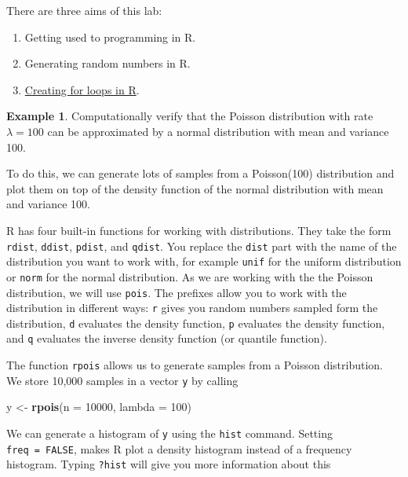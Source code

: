 \documentclass[
]{book}
\newenvironment{Shaded}{\begin{snugshade}}{\end{snugshade}}
\newcommand{\AttributeTok}[1]{\textcolor[rgb]{0.13,0.29,0.53}{#1}}
\newcommand{\DecValTok}[1]{\textcolor[rgb]{0.00,0.00,0.81}{#1}}
\newcommand{\FunctionTok}[1]{\textcolor[rgb]{0.13,0.29,0.53}{\textbf{#1}}}
\newcommand{\NormalTok}[1]{#1}
\newcommand{\OtherTok}[1]{\textcolor[rgb]{0.56,0.35,0.01}{#1}}
\providecommand{\tightlist}{%
  \setlength{\itemsep}{0pt}\setlength{\parskip}{0pt}}
\theoremstyle{definition}
\theoremstyle{definition}
\newtheorem{example}{Example}[chapter]
\theoremstyle{definition}
\theoremstyle{definition}
\theoremstyle{remark}
\begin{document}
There are three aims of this lab:

\begin{enumerate}
\def\labelenumi{\arabic{enumi}.}
\tightlist
\item
  Getting used to programming in R.
\item
  Generating random numbers in R.
\item
  \href{https://www.w3schools.com/r/r_for_loop.asp}{Creating for loops in R}.
\end{enumerate}

\begin{example}
Computationally verify that the Poisson distribution with rate \(\lambda = 100\) can be approximated by a normal distribution with mean and variance 100.

To do this, we can generate lots of samples from a Poisson(100) distribution and plot them on top of the density function of the normal distribution with mean and variance 100.

R has four built-in functions for working with distributions. They take the form \texttt{rdist}, \texttt{ddist}, \texttt{pdist}, and \texttt{qdist}. You replace the \texttt{dist} part with the name of the distribution you want to work with, for example \texttt{unif} for the uniform distribution or \texttt{norm} for the normal distribution. As we are working with the the Poisson distribution, we will use \texttt{pois}. The prefixes allow you to work with the distribution in different ways: \texttt{r} gives you random numbers sampled form the distribution, \texttt{d} evaluates the density function, \texttt{p} evaluates the density function, and \texttt{q} evaluates the inverse density function (or quantile function).

The function \texttt{rpois} allows us to generate samples from a Poisson distribution. We store 10,000 samples in a vector \texttt{y} by calling

\begin{Shaded}
\begin{Highlighting}[]
\NormalTok{y }\OtherTok{\textless{}{-}} \FunctionTok{rpois}\NormalTok{(}\AttributeTok{n =} \DecValTok{10000}\NormalTok{, }\AttributeTok{lambda =} \DecValTok{100}\NormalTok{)}
\end{Highlighting}
\end{Shaded}

We can generate a histogram of \texttt{y} using the \texttt{hist} command. Setting \texttt{freq\ =\ FALSE}, makes R plot a density histogram instead of a frequency histogram. Typing \texttt{?hist} will give you more information about this


\end{example}
\end{document}
